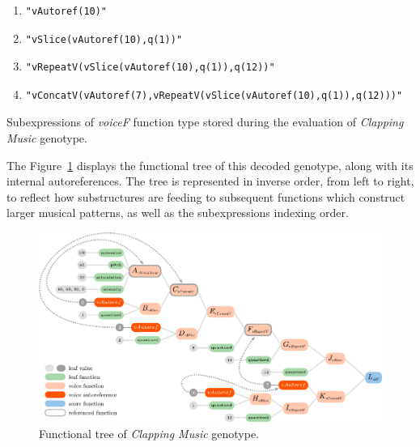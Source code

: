 \documentclass{article}
\begin{document}
\begin{table}[ht]
{\begin{enumerate}[start=0]
\begin{verbatim}
"vAutoref(7)"
\end{verbatim}
\item \begin{verbatim}
"vAutoref(10)"
\end{verbatim}
\item \begin{verbatim}
"vSlice(vAutoref(10),q(1))"
\end{verbatim}
\item \begin{verbatim}
"vRepeatV(vSlice(vAutoref(10),q(1)),q(12))"
\end{verbatim}
\item \begin{verbatim}
"vConcatV(vAutoref(7),vRepeatV(vSlice(vAutoref(10),q(1)),q(12)))"
\end{verbatim}
\end{enumerate}}
\vspace{0.4cm}
\caption{Subexpressions of \emph{voiceF} function type stored during the evaluation of \emph{Clapping Music} genotype.}
\label{table:subexp}
\end{table}

The Figure~\ref{fig:claptree} displays the functional tree of this decoded genotype, along with its internal autoreferences. The tree is represented in inverse order, from left to right, to reflect how substructures are feeding to subsequent functions which construct larger musical patterns, as well as the subexpressions indexing order.

\begin{figure}[H]
  \includegraphics[width=\linewidth]{figs/clapping_tree_graph_colours_code.pdf}
  
  \caption{Functional tree of \emph{Clapping Music} genotype.}
  \label{fig:claptree}
\end{figure}
\end{document}
